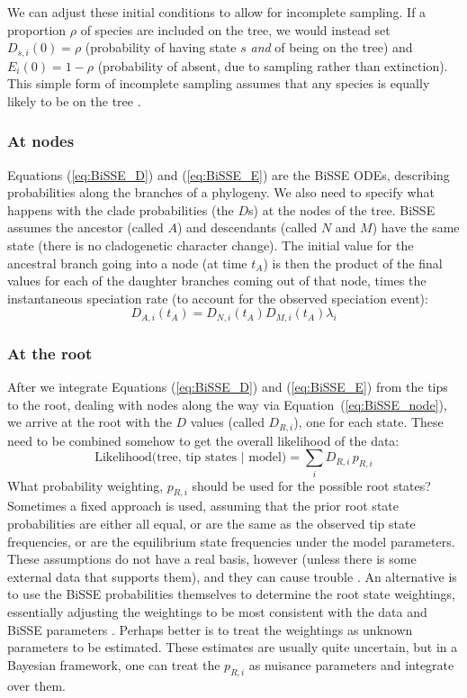 We can adjust these initial conditions to allow for incomplete sampling.
If a proportion $\rho$ of species are included on the tree, we would instead set $D_{s,i}(0) = \rho$ (probability of having state $s$ \emph{and} of being on the tree) and $E_i(0) = 1-\rho$ (probability of absent, due to sampling rather than extinction).
This simple form of incomplete sampling assumes that any species is equally likely to be on the tree \citep{FitzJohn2009}.

\subsubsection{At nodes}

Equations (\ref{eq:BiSSE_D}) and (\ref{eq:BiSSE_E}) are the BiSSE ODEs, describing probabilities along the branches of a phylogeny.
We also need to specify what happens with the clade probabilities (the $D$s) at the nodes of the tree.
BiSSE assumes the ancestor (called $A$) and descendants (called $N$ and $M$) have the same state (\IE there is no cladogenetic character change).
The initial value for the ancestral branch going into a node (at time $t_A$) is then the product of the final values for each of the daughter branches coming out of that node, times the instantaneous speciation rate (to account for the observed speciation event):
\begin{equation}
    D_{A, i}(t_A) = D_{N, i}(t_A) D_{M, i}(t_A) \lambda_i
    \label{eq:BiSSE_node}
\end{equation}

\subsubsection{At the root}

After we integrate Equations (\ref{eq:BiSSE_D}) and (\ref{eq:BiSSE_E}) from the tips to the root, dealing with nodes along the way via Equation~(\ref{eq:BiSSE_node}), we arrive at the root with the $D$ values (called $D_{R, i}$), one for each state.
These need to be combined somehow to get the overall likelihood of the data:
\begin{equation*}
    \text{Likelihood(tree, tip states | model)} = \sum_i D_{R, i} \, p_{R, i}
\end{equation*}
What probability weighting, $p_{R, i}$ should be used for the possible root states?
Sometimes a fixed approach is used, assuming that the prior root state probabilities are either all equal, or are the same as the observed tip state frequencies, or are the equilibrium state frequencies under the model parameters.
These assumptions do not have a real basis, however (unless there is some external data that supports them), and they can cause trouble \citep{Goldberg2008}.
An alternative is to use the BiSSE probabilities themselves to determine the root state weightings, essentially adjusting the weightings to be most consistent with the data and BiSSE parameters \citep{FitzJohn2009}.
Perhaps better is to treat the weightings as unknown parameters to be estimated.
These estimates are usually quite uncertain, but in a Bayesian framework, one can treat the $p_{R, i}$ as nuisance parameters and integrate over them. 

